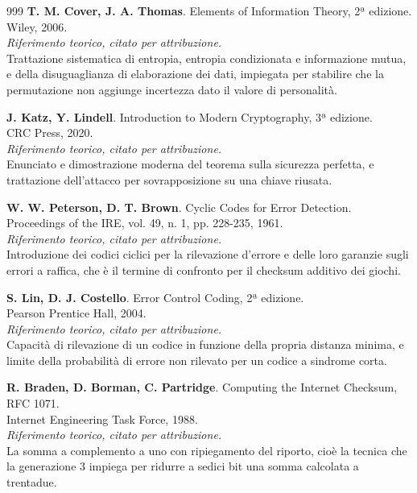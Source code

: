 \begin{thebibliography}{999}
  \textbf{T. M. Cover, J. A. Thomas}. Elements of Information Theory, 2ª edizione.
  \\ Wiley, 2006.
  \\ \emph{Riferimento teorico, citato per attribuzione.}
  \\ Trattazione sistematica di entropia, entropia condizionata e informazione mutua, e della disuguaglianza di elaborazione dei dati, impiegata per stabilire che la permutazione non aggiunge incertezza dato il valore di personalità.

  \textbf{J. Katz, Y. Lindell}. Introduction to Modern Cryptography, 3ª edizione.
  \\ CRC Press, 2020.
  \\ \emph{Riferimento teorico, citato per attribuzione.}
  \\ Enunciato e dimostrazione moderna del teorema sulla sicurezza perfetta, e trattazione dell'attacco per sovrapposizione su una chiave riusata.

  \textbf{W. W. Peterson, D. T. Brown}. Cyclic Codes for Error Detection.
  \\ Proceedings of the IRE, vol. 49, n. 1, pp. 228-235, 1961.
  \\ \emph{Riferimento teorico, citato per attribuzione.}
  \\ Introduzione dei codici ciclici per la rilevazione d'errore e delle loro garanzie sugli errori a raffica, che è il termine di confronto per il checksum additivo dei giochi.

  \textbf{S. Lin, D. J. Costello}. Error Control Coding, 2ª edizione.
  \\ Pearson Prentice Hall, 2004.
  \\ \emph{Riferimento teorico, citato per attribuzione.}
  \\ Capacità di rilevazione di un codice in funzione della propria distanza minima, e limite della probabilità di errore non rilevato per un codice a sindrome corta.

  \textbf{R. Braden, D. Borman, C. Partridge}. Computing the Internet Checksum, RFC 1071.
  \\ Internet Engineering Task Force, 1988.
  \\ \emph{Riferimento teorico, citato per attribuzione.}
  \\ La somma a complemento a uno con ripiegamento del riporto, cioè la tecnica che la generazione 3 impiega per ridurre a sedici bit una somma calcolata a trentadue.


\end{thebibliography}
